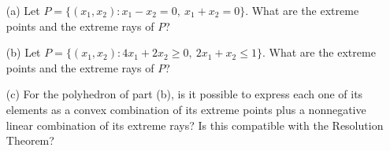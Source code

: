 
\begin{itemize}
	\item[(a)] Let $P=\{(x_1,x_2) : x_1 - x_2 = 0,~ x_1 + x_2 = 0\}$. What are the extreme points and the extreme rays of $P$?
	\item[(b)] Let $P=\{(x_1,x_2) : 4x_1 + 2x_2 \geq 0,~ 2x_1 + x_2 \leq 1\}$. What are the extreme points and the extreme rays of $P$?
	\item[(c)] For the polyhedron of part (b), is it possible to express each one of its elements as a convex combination of its extreme points plus a nonnegative linear combination of its extreme rays? Is this compatible with the Resolution Theorem? 
\end{itemize}